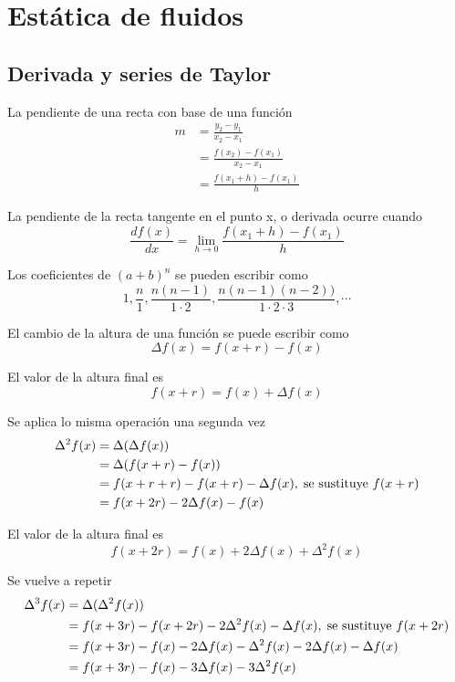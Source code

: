 \section{Estática de fluidos}

\subsection{Derivada y series de Taylor}

La pendiente de una recta con base de una función
\[
    \begin{split}
        m & = \frac{ y_{2} - y_{1} }{ x_{2} - x_{1} } \\
        & = \frac{ f(x_{2}) - f(x_{1}) }{ x_{2} - x_{1} } \\
        & = \frac{ f(x_{1} + h ) - f(x_{1}) }{ h }
    \end{split}
\]

La pendiente de la recta tangente en el punto x, o derivada ocurre cuando
\[
    \frac{ df(x) }{ dx } = \lim_{h \to 0} \frac{ f(x_{1} + h ) - f(x_{1}) }{ h }
\]

Los coeficientes de \( (a + b)^{n} \) se pueden escribir como 
\[
    1, \frac{ n }{ 1 }, \frac{ n(n-1) }{ 1 \cdot 2 }, \frac{ n(n-1)(n-2)) }{ 1 \cdot 2 \cdot 3 }, \cdots
\]

El cambio de la altura de una función se puede escribir como
\[
    \Delta f(x) = f(x + r) - f(x)
\]

El valor de la altura final es
\[
    f(x + r) = f(x) + \Delta f(x)
\]

Se aplica lo misma operación una segunda vez
\[
    \begin{split}
        \Delta^{2} f(x) & = \Delta (\Delta f(x)) \\
        & = \Delta( f(x + r) -f(x) ) \\
        & = f(x + r + r) - f(x + r) - \Delta f(x) , \; \text{se sustituye \( f(x + r) \)}\\
        & = f(x + 2r) - 2\Delta f(x) - f(x)\\
    \end{split}
\]

El valor de la altura final es
\[
    f(x + 2r) = f(x) + 2\Delta f(x) + \Delta^{2}f(x)
\]

Se vuelve a repetir 
\[
    \begin{split}
        \Delta^{3} f(x) & = \Delta (\Delta^{2} f(x)) \\
        & = f(x + 3r) - f(x + 2r) - 2\Delta^{2} f(x) - \Delta f(x), \; \text{se sustituye \( f(x + 2r) \)} \\
        & = f(x + 3r) - f(x) - 2\Delta f(x) - \Delta^{2}f(x) - 2\Delta f(x) - \Delta f(x) \\
        & = f(x +3r) - f(x) - 3\Delta f(x) - 3\Delta^{2} f(x)
    \end{split}
\]

